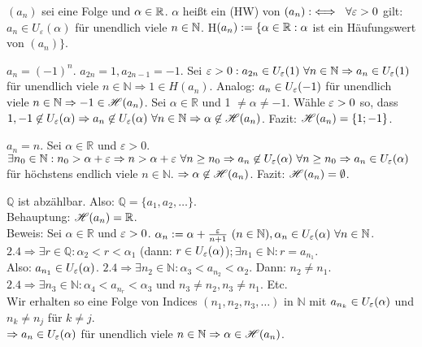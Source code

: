 \documentclass[a4paper,twoside,DIV15,BCOR12mm]{scrbook}
\begin{document}
\begin{definition}[Häufungwerte]
$(a_n)$ sei eine Folge und $\alpha \in\mathbb{R}$. $\alpha$ heißt ein  (HW) von $(a_n) :\iff\ \forall \varepsilon > 0$ gilt: $a_n \in  U_\varepsilon(\alpha)$ für unendlich viele $n\in\mathbb{N}$. H$(a_n) := \{\alpha\in\mathbb{R}: \alpha$ ist ein Häufungswert von $(a_n) \}$.
\end{definition}

\begin{beispiele}
\item $a_n = (-1)^n$. $a_{2n} = 1, a_{2n-1} = -1.$ 
Sei $\ep > 0: a_{2n} \in U_{\ep}(1)\ \forall n \in \mathbb{N} \Rightarrow a_n \in U_{\ep}(1)$ 
für unendlich viele $n \in \mathbb{N} \Rightarrow 1 \in H (a_n)$. 
Analog: $a_n \in U_{\varepsilon}(-1)$ für unendlich viele $n \in \mathbb{N} \Rightarrow -1 \in \mathscr{H}(a_n)$. 
Sei $\alpha \in \mathbb{R}$ und 1 $\neq \alpha \neq -1$. 
W\"{a}hle $\varepsilon > 0$ so, dass $1, -1 \not\in U_{\varepsilon}(\alpha) \Rightarrow a_n \not\in U_{\varepsilon}(\alpha)\ \forall n \in \mathbb{N} \Rightarrow \alpha \not\in \mathscr{H}(a_{n})$. 
Fazit: $\mathscr{H}(a_n) = \{1; -1\}$.
\item $a_n = n$. Sei $\alpha \in \mathbb{R}$ und $\varepsilon > 0$. $\exists n_0 \in \mathbb{N}: n_0 > \alpha + \varepsilon \Rightarrow n > \alpha + \varepsilon\ \forall n \geq n_0 \Rightarrow a_n \not\in U_{\varepsilon}(\alpha)\ \forall n \geq n_0 \Rightarrow a_n \in U_{\varepsilon}(\alpha)$ für h\"{o}chstens endlich viele $n \in \mathbb{N}$. $\Rightarrow \alpha \not\in \mathscr{H}(a_n)$. Fazit: $\mathscr{H}(a_n) = \emptyset$.
\item $\mathbb{Q}$ ist abz\"{a}hlbar. Also: $\mathbb{Q} = \{a_1, a_2, \ldots\}$.\\
Behauptung: $\mathscr{H}(a_n) = \mathbb{R}$. \\
Beweis: Sei $\alpha \in \mathbb{R}$ und $\varepsilon > 0$. $\alpha_n := \alpha + \frac{\varepsilon}{n + 1}\  (n \in \mathbb{N}), \alpha_n \in U_{\varepsilon}(\alpha)\ \forall n\in\mathbb{N}$. \\
$2.4 \Rightarrow \exists r \in \mathbb{Q}: \alpha_2 < r < \alpha_1 $ (dann: $r \in U_{\varepsilon}(\alpha)$)$; \exists n_1 \in \mathbb{N}: r = a_{n_1}$. \\
Also: $a_{n_1} \in U_{\varepsilon}(\alpha)$. $2.4 \Rightarrow \exists n_2 \in \mathbb{N}: \alpha_3 < a_{n_2} < \alpha_2$. Dann: $n_2 \neq n_1$. $2.4 \Rightarrow \exists n_3 \in \mathbb{N}: \alpha_4 < a_{n_r} < \alpha_3$ und $n_3 \neq n_2, n_3 \neq n_1$. Etc. \\
Wir erhalten so eine Folge von Indices $(n_1, n_2, n_3, \ldots)$ in $\mathbb{N}$ mit $a_{n_k} \in U_{\varepsilon}(\alpha)$ und $n_k \neq n_j$ f\"{u}r $k \neq j$.\\
$\Rightarrow a_n \in U_{\varepsilon}(\alpha)$ f\"{u}r unendlich viele $n \in \mathbb{N} \Rightarrow \alpha \in \mathscr{H}(a_n)$.
\end{beispiele}
\end{document}
